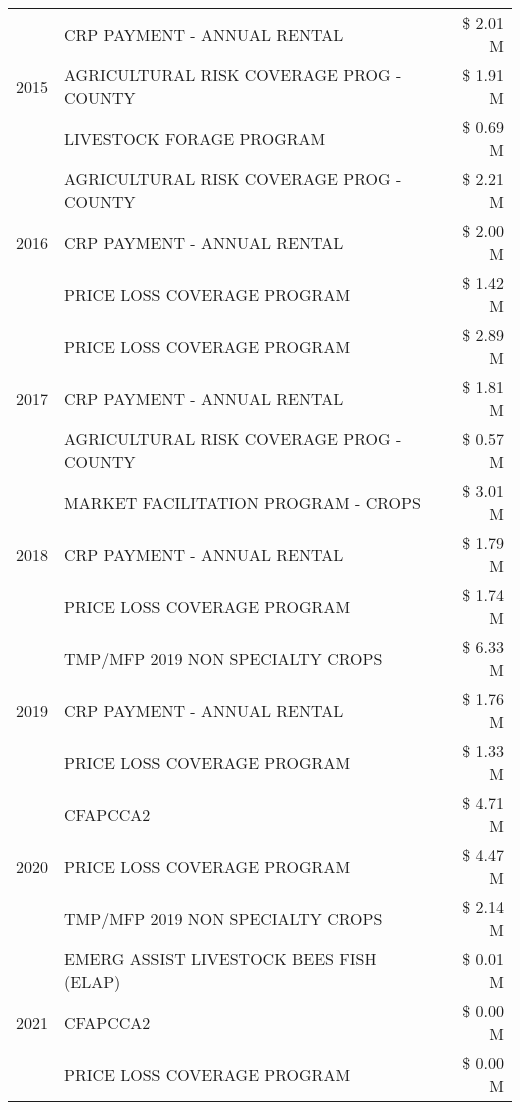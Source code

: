 \begin{tabular}{llr}
\cline{1-3}
\multirow[t]{3}{*}{2015} & CRP PAYMENT - ANNUAL RENTAL & \$ 2.01 M \\
 & AGRICULTURAL RISK COVERAGE PROG - COUNTY & \$ 1.91 M \\
 & LIVESTOCK FORAGE PROGRAM & \$ 0.69 M \\
\cline{1-3}
\multirow[t]{3}{*}{2016} & AGRICULTURAL RISK COVERAGE PROG - COUNTY & \$ 2.21 M \\
 & CRP PAYMENT - ANNUAL RENTAL & \$ 2.00 M \\
 & PRICE LOSS COVERAGE PROGRAM & \$ 1.42 M \\
\cline{1-3}
\multirow[t]{3}{*}{2017} & PRICE LOSS COVERAGE PROGRAM & \$ 2.89 M \\
 & CRP PAYMENT - ANNUAL RENTAL & \$ 1.81 M \\
 & AGRICULTURAL RISK COVERAGE PROG - COUNTY & \$ 0.57 M \\
\cline{1-3}
\multirow[t]{3}{*}{2018} & MARKET FACILITATION PROGRAM - CROPS & \$ 3.01 M \\
 & CRP PAYMENT - ANNUAL RENTAL & \$ 1.79 M \\
 & PRICE LOSS COVERAGE PROGRAM & \$ 1.74 M \\
\cline{1-3}
\multirow[t]{3}{*}{2019} & TMP/MFP 2019 NON SPECIALTY CROPS & \$ 6.33 M \\
 & CRP PAYMENT - ANNUAL RENTAL & \$ 1.76 M \\
 & PRICE LOSS COVERAGE PROGRAM & \$ 1.33 M \\
\cline{1-3}
\multirow[t]{3}{*}{2020} & CFAPCCA2 & \$ 4.71 M \\
 & PRICE LOSS COVERAGE PROGRAM & \$ 4.47 M \\
 & TMP/MFP 2019 NON SPECIALTY CROPS & \$ 2.14 M \\
\cline{1-3}
\multirow[t]{3}{*}{2021} & EMERG ASSIST LIVESTOCK BEES FISH (ELAP) & \$ 0.01 M \\
 & CFAPCCA2 & \$ 0.00 M \\
 & PRICE LOSS COVERAGE PROGRAM & \$ 0.00 M \\
\cline{1-3}
\bottomrule
\end{tabular}
